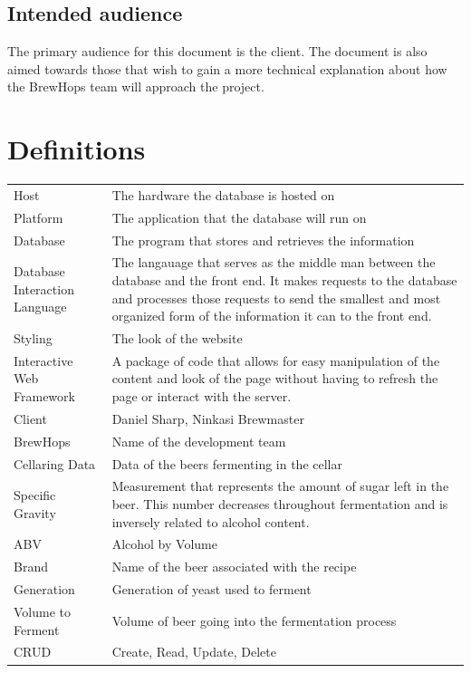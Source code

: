 \documentclass[draftclsnofoot,onecolumn,letterpaper,10pt]{IEEEtran}
\begin{document}
	\subsection{Intended audience}

	The primary audience for this document is the client.
	The document is also aimed towards those that wish to gain a more technical explanation about how the BrewHops team will approach the project.

\section{Definitions}
\begin{longtable}{p{4cm}p{12cm}}
    Host & The hardware the database is hosted on \\
    Platform & The application that the database will run on \\
    Database & The program that stores and retrieves the information \\
    Database Interaction Language & The langauage that serves as the middle man between the database and the front end. It makes requests to the database and processes those requests to send the smallest and most organized form of the information it can to the front end. \\
    Styling & The look of the website \\
    Interactive Web Framework & A package of code that allows for easy manipulation of the content and look of the page without having to refresh the page or interact with the server. \\
    Client & Daniel Sharp, Ninkasi Brewmaster \\
    BrewHops & Name of the development team \\
    Cellaring Data & Data of the beers fermenting in the cellar \\
    Specific Gravity & Measurement that represents the amount of sugar left in the beer. This number decreases throughout fermentation and is inversely related to alcohol content. \\
    ABV & Alcohol by Volume \\
    Brand & Name of the beer associated with the recipe \\
    Generation & Generation of yeast used to ferment \\
    Volume to Ferment & Volume of beer going into the fermentation process \\
    CRUD & Create, Read, Update, Delete \\

\end{longtable}
\end{document}
